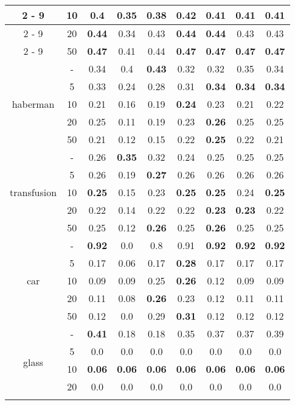 \documentclass{article}%
\begin{document}
\begin{longtable}{c|c|ccccccc}
\cline{2%
-%
9}%
&10&0.4&0.35&0.38&\textbf{0.42}&0.41&0.41&0.41\\%
\cline{2%
-%
9}%
&20&\textbf{0.44}&0.34&0.43&\textbf{0.44}&\textbf{0.44}&0.43&0.43\\%
\cline{2%
-%
9}%
&50&\textbf{0.47}&0.41&0.44&\textbf{0.47}&\textbf{0.47}&\textbf{0.47}&\textbf{0.47}\\%
\hline%
\multirow{5}{*}{haberman}&{-}&0.34&0.4&\textbf{0.43}&0.32&0.32&0.35&0.34\\%
\cline{2%
-%
9}%
&5&0.33&0.24&0.28&0.31&\textbf{0.34}&\textbf{0.34}&\textbf{0.34}\\%
\cline{2%
-%
9}%
&10&0.21&0.16&0.19&\textbf{0.24}&0.23&0.21&0.22\\%
\cline{2%
-%
9}%
&20&0.25&0.11&0.19&0.23&\textbf{0.26}&0.25&0.25\\%
\cline{2%
-%
9}%
&50&0.21&0.12&0.15&0.22&\textbf{0.25}&0.22&0.21\\%
\hline%
\multirow{5}{*}{transfusion}&{-}&0.26&\textbf{0.35}&0.32&0.24&0.25&0.25&0.25\\%
\cline{2%
-%
9}%
&5&0.26&0.19&\textbf{0.27}&0.26&0.26&0.26&0.26\\%
\cline{2%
-%
9}%
&10&\textbf{0.25}&0.15&0.23&\textbf{0.25}&\textbf{0.25}&0.24&\textbf{0.25}\\%
\cline{2%
-%
9}%
&20&0.22&0.14&0.22&0.22&\textbf{0.23}&\textbf{0.23}&0.22\\%
\cline{2%
-%
9}%
&50&0.25&0.12&\textbf{0.26}&0.25&\textbf{0.26}&0.25&0.25\\%
\hline%
\multirow{5}{*}{car}&{-}&\textbf{0.92}&0.0&0.8&0.91&\textbf{0.92}&\textbf{0.92}&\textbf{0.92}\\%
\cline{2%
-%
9}%
&5&0.17&0.06&0.17&\textbf{0.28}&0.17&0.17&0.17\\%
\cline{2%
-%
9}%
&10&0.09&0.09&0.25&\textbf{0.26}&0.12&0.09&0.09\\%
\cline{2%
-%
9}%
&20&0.11&0.08&\textbf{0.26}&0.23&0.12&0.11&0.11\\%
\cline{2%
-%
9}%
&50&0.12&0.0&0.29&\textbf{0.31}&0.12&0.12&0.12\\%
\hline%
\multirow{5}{*}{glass}&{-}&\textbf{0.41}&0.18&0.18&0.35&0.37&0.37&0.39\\%
\cline{2%
-%
9}%
&5&0.0&0.0&0.0&0.0&0.0&0.0&0.0\\%
\cline{2%
-%
9}%
&10&\textbf{0.06}&\textbf{0.06}&\textbf{0.06}&\textbf{0.06}&\textbf{0.06}&\textbf{0.06}&\textbf{0.06}\\%
\cline{2%
-%
9}%
&20&0.0&0.0&0.0&0.0&0.0&0.0&0.0\\%
\cline{2%
}
\end{longtable}
\end{document}
